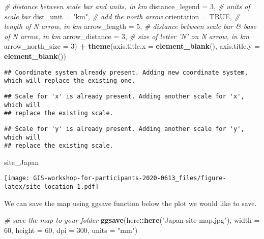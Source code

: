 \documentclass[
  xelatex,ja=standard]{bxjsarticle}
\newenvironment{Shaded}{\begin{snugshade}}{\end{snugshade}}
\newcommand{\CommentTok}[1]{\textcolor[rgb]{0.56,0.35,0.01}{\textit{#1}}}
\newcommand{\DataTypeTok}[1]{\textcolor[rgb]{0.13,0.29,0.53}{#1}}
\newcommand{\DecValTok}[1]{\textcolor[rgb]{0.00,0.00,0.81}{#1}}
\newcommand{\KeywordTok}[1]{\textcolor[rgb]{0.13,0.29,0.53}{\textbf{#1}}}
\newcommand{\NormalTok}[1]{#1}
\newcommand{\OperatorTok}[1]{\textcolor[rgb]{0.81,0.36,0.00}{\textbf{#1}}}
\newcommand{\OtherTok}[1]{\textcolor[rgb]{0.56,0.35,0.01}{#1}}
\newcommand{\StringTok}[1]{\textcolor[rgb]{0.31,0.60,0.02}{#1}}
\begin{document}
\begin{Shaded}
\begin{Highlighting}[]
    \CommentTok{# distance between scale bar and units, in km}
    \DataTypeTok{distance_legend =} \DecValTok{3}\NormalTok{,}
    \CommentTok{# units of scale bar}
    \DataTypeTok{dist_unit =} \StringTok{"km"}\NormalTok{,}
    \CommentTok{# add the north arrow}
    \DataTypeTok{orientation =} \OtherTok{TRUE}\NormalTok{,}
    \CommentTok{# length of N arrow, in km}
    \DataTypeTok{arrow_length =} \DecValTok{5}\NormalTok{,}
    \CommentTok{# distance between scale bar & base of N arrow, in km}
    \DataTypeTok{arrow_distance =} \DecValTok{3}\NormalTok{,}
    \CommentTok{# size of letter 'N' on N arrow, in km}
    \DataTypeTok{arrow_north_size =} \DecValTok{3}\NormalTok{) }\OperatorTok{+}
\StringTok{  }\KeywordTok{theme}\NormalTok{(}\DataTypeTok{axis.title.x =} \KeywordTok{element_blank}\NormalTok{(),}
        \DataTypeTok{axis.title.y =} \KeywordTok{element_blank}\NormalTok{())}
\end{Highlighting}
\end{Shaded}

\begin{verbatim}
## Coordinate system already present. Adding new coordinate system, which will replace the existing one.
\end{verbatim}

\begin{verbatim}
## Scale for 'x' is already present. Adding another scale for 'x', which will
## replace the existing scale.
\end{verbatim}

\begin{verbatim}
## Scale for 'y' is already present. Adding another scale for 'y', which will
## replace the existing scale.
\end{verbatim}

\begin{Shaded}
\begin{Highlighting}[]
\NormalTok{site_Japan}
\end{Highlighting}
\end{Shaded}

\texttt{[image: GIS-workshop-for-participants-2020-0613\_files/figure-latex/site-location-1.pdf]}

We can save the map using ggsave function below the plot we would like
to save.

\begin{Shaded}
\begin{Highlighting}[]
\CommentTok{# save the map to your folder }
\KeywordTok{ggsave}\NormalTok{(here}\OperatorTok{::}\KeywordTok{here}\NormalTok{(}\StringTok{"Japan-site-map.jpg"}\NormalTok{),}
       \DataTypeTok{width =} \DecValTok{60}\NormalTok{,}
       \DataTypeTok{height =} \DecValTok{60}\NormalTok{,}
       \DataTypeTok{dpi =} \DecValTok{300}\NormalTok{,}
       \DataTypeTok{units =} \StringTok{"mm"}\NormalTok{)}
\end{Highlighting}
\end{Shaded}
\end{document}

